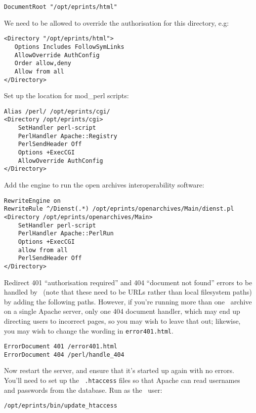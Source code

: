 \begin{verbatim}
DocumentRoot "/opt/eprints/html"
\end{verbatim}

We need to be allowed to override the authorisation for this directory, e.g:

\begin{verbatim}
<Directory "/opt/eprints/html">
   Options Includes FollowSymLinks
   AllowOverride AuthConfig
   Order allow,deny
   Allow from all
</Directory>
\end{verbatim}

Set up the location for mod\_perl scripts:

\begin{verbatim}
Alias /perl/ /opt/eprints/cgi/
<Directory /opt/eprints/cgi>
    SetHandler perl-script
    PerlHandler Apache::Registry
    PerlSendHeader Off
    Options +ExecCGI
    AllowOverride AuthConfig
</Directory>
\end{verbatim}

Add the engine to run the open archives interoperability software:

\begin{verbatim}
RewriteEngine on
RewriteRule ^/Dienst(.*) /opt/eprints/openarchives/Main/dienst.pl
<Directory /opt/eprints/openarchives/Main>
    SetHandler perl-script
    PerlHandler Apache::PerlRun
    Options +ExecCGI
    allow from all
    PerlSendHeader Off
</Directory>
\end{verbatim}

Redirect 401 ``authorisation required'' and 404 ``document not found'' errors to be handled by \eprints\ (note that these need to be URLs rather than local filesystem paths) by adding the following paths. However, if you're running more than one \eprints\ archive on a single Apache server, only one 404 document handler, which may end up directing users to incorrect pages, so you may wish to leave that out; likewise, you may wish to change the wording in {\tt error401.html}.

\begin{verbatim}
ErrorDocument 401 /error401.html
ErrorDocument 404 /perl/handle_404
\end{verbatim}

Now restart the server, and ensure that it's started up again with no errors. You'll need to set up the \eprints\ {\tt .htaccess} files so that Apache can read usernames and passwords from the database. Run as the \eprints\ user:

\begin{verbatim}
/opt/eprints/bin/update_htaccess
\end{verbatim}

